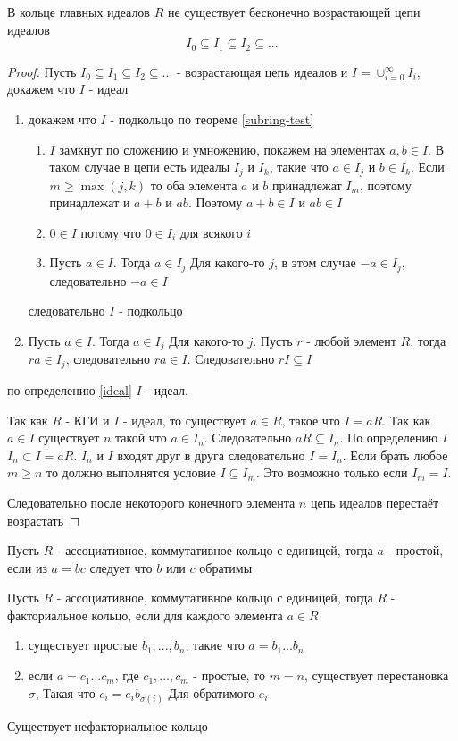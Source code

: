 \documentclass[../main/document.tex]{subfiles}
\begin{document}
\begin{thm}\label{ascending-chain-condition}
В кольце главных идеалов $R$ не существует бесконечно возрастающей цепи идеалов
$$I_0\subseteq I_1\subseteq I_2\subseteq ...$$
\begin{proof}
Пусть $I_0\subseteq I_1\subseteq I_2\subseteq ...$ - возрастающая цепь идеалов и $I=\cup_{i=0}^\infty I_i$, докажем что $I$ - идеал
\begin{enumerate}
\item докажем что $I$ - подкольцо по теореме \ref{subring-test}
\begin{enumerate}
\item $I$ замкнут по сложению и умножению, покажем на элементах $a,b\in I$. В таком случае в цепи есть идеалы $I_j$ и $I_k$, такие что $a\in I_j$ и $b\in I_k$. Если $m\geq \max(j,k)$ то оба элемента $a$ и $b$ принадлежат $I_m$, поэтому принадлежат и $a+b$ и $ab$. Поэтому $a+b\in I$ и $ab\in I$
\item $0\in I$ потому что $0\in I_i$ для всякого $i$
\item Пусть $a\in I$. Тогда $a\in I_j$ Для какого-то $j$, в этом случае $-a\in I_j$, следовательно $-a\in I$
\end{enumerate}
следовательно $I$ - подкольцо
\item Пусть $a\in I$. Тогда $a\in I_j$ Для какого-то $j$. Пусть $r$ - любой элемент $R$, тогда $ra\in I_j$, следовательно $ra\in I$. Следовательно $rI\subseteq I$
\end{enumerate}
по определению \ref{ideal} $I$ - идеал.

Так как $R$ - КГИ и $I$ - идеал, то существует $a\in R$, такое что $I=aR$. Так как $a\in I$ существует $n$ такой что $a\in I_n$. Следовательно $aR\subseteq I_n$. По определению $I$ $I_n\subset I=aR$. $I_n$ и $I$ входят друг в друга следовательно $I=I_n$. Если брать любое $m\geq n$ то должно выполнятся условие $I\subseteq I_m$. Это возможно только если $I_m=I$.

 Следовательно после некоторого конечного элемента $n$ цепь идеалов перестаёт возрастать
\end{proof}
\end{thm}
\begin{dfn}
Пусть $R$ - ассоциативное, коммутативное кольцо с единицей, тогда $a$ - простой, если из $a=bc$ следует что $b$ или $c$ обратимы
\end{dfn}
\begin{dfn}\label{factorial-ring}
Пусть $R$ - ассоциативное, коммутативное кольцо с единицей, тогда $R$ - факториальное кольцо, если для каждого элемента $a\in R$
\begin{enumerate}
\item существует простые $b_1,...,b_n$, такие что $a=b_1...b_n$
\item если $a=c_1...c_m$, где $c_1,...,c_m$ - простые, то $m=n$, существует перестановка $\sigma$, Такая что $c_i=e_ib_{\sigma(i)}$ Для обратимого $e_i$
\end{enumerate} 
\end{dfn}
\begin{thm}
Существует нефакториальное кольцо
\end{thm}
\end{document}
